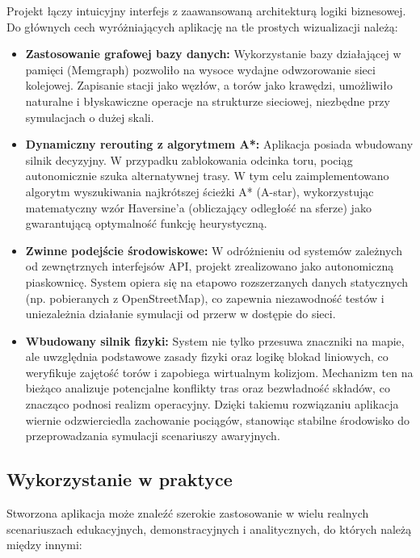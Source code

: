 \documentclass[twoside]{projektInzynierskiMS1z}
\begin{document}
Projekt łączy intuicyjny interfejs z zaawansowaną architekturą logiki biznesowej.
Do głównych cech wyróżniających aplikację na tle prostych wizualizacji należą:

\begin{itemize}
\item \textbf{Zastosowanie grafowej bazy danych:} Wykorzystanie bazy działającej
w pamięci (Memgraph) pozwoliło na wysoce wydajne odwzorowanie sieci kolejowej.
Zapisanie stacji jako węzłów, a torów jako krawędzi, umożliwiło naturalne
i błyskawiczne operacje na strukturze sieciowej, niezbędne przy symulacjach
o dużej skali.

\item \textbf{Dynamiczny rerouting z algorytmem A*:} Aplikacja posiada wbudowany
silnik decyzyjny. W przypadku zablokowania odcinka toru, pociąg autonomicznie szuka
alternatywnej trasy. W tym celu zaimplementowano algorytm wyszukiwania najkrótszej
ścieżki A* (A-star), wykorzystując matematyczny wzór Haversine'a (obliczający
odległość na sferze) jako gwarantującą optymalność funkcję heurystyczną.

\item \textbf{Zwinne podejście środowiskowe:} W odróżnieniu od systemów zależnych
od zewnętrznych interfejsów API, projekt zrealizowano jako autonomiczną piaskownicę.
System opiera się na etapowo rozszerzanych danych statycznych (np. pobieranych
z OpenStreetMap), co zapewnia niezawodność testów i uniezależnia działanie symulacji
od przerw w dostępie do sieci.

\item \textbf{Wbudowany silnik fizyki:} System nie tylko przesuwa znaczniki na mapie,
ale uwzględnia podstawowe zasady fizyki oraz logikę blokad liniowych, co weryfikuje
zajętość torów i zapobiega wirtualnym kolizjom. Mechanizm ten na bieżąco analizuje
potencjalne konflikty tras oraz bezwładność składów, co znacząco podnosi realizm
operacyjny. Dzięki takiemu rozwiązaniu aplikacja wiernie odzwierciedla zachowanie
pociągów, stanowiąc stabilne środowisko do przeprowadzania symulacji scenariuszy
awaryjnych.
\end{itemize}

\subsection{Wykorzystanie w praktyce}

Stworzona aplikacja może znaleźć szerokie zastosowanie w wielu realnych scenariuszach
edukacyjnych, demonstracyjnych i analitycznych, do których należą między innymi:
\end{document}
